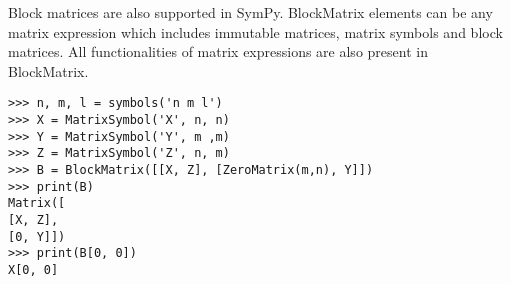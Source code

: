 Block matrices are also supported in SymPy. BlockMatrix elements can be
any matrix expression which includes immutable matrices, matrix symbols and
block matrices. All functionalities of matrix expressions are also present in
BlockMatrix.


\begin{verbatim}
>>> n, m, l = symbols('n m l')
>>> X = MatrixSymbol('X', n, n)
>>> Y = MatrixSymbol('Y', m ,m)
>>> Z = MatrixSymbol('Z', n, m)
>>> B = BlockMatrix([[X, Z], [ZeroMatrix(m,n), Y]])
>>> print(B)
Matrix([
[X, Z],
[0, Y]])
>>> print(B[0, 0])
X[0, 0]
\end{verbatim}
